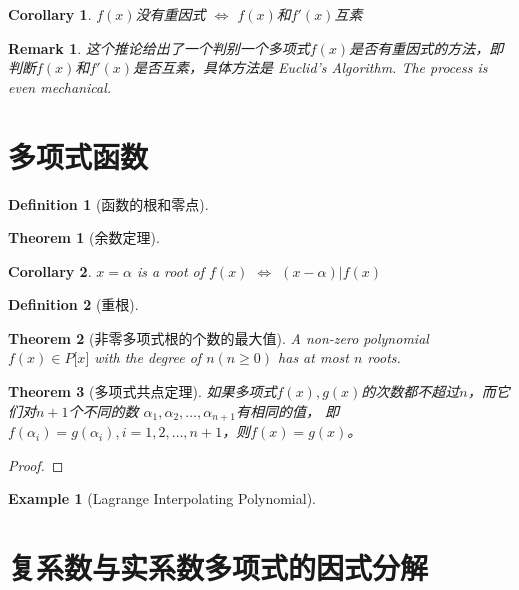 \documentclass[onecolumn]{ctexart}
\newtheorem{definition}{Definition}
\newtheorem{theorem}{Theorem}
\newtheorem{corollary}{Corollary}
\newtheorem{remark}{Remark}
\newtheorem{example}{Example}
\begin{document}
\begin{corollary}
  $f(x)$没有重因式 $\Leftrightarrow$ $f(x)$和$f'(x)$互素
\end{corollary}
\begin{remark}
  这个推论给出了一个判别一个多项式$f(x)$是否有重因式的方法，即判断$f(x)$和$f'(x)$是否互素，具体方法是
  Euclid's Algorithm. The process is even mechanical.
\end{remark}

\section{多项式函数}

\begin{definition}[函数的根和零点]
  
\end{definition}

\begin{theorem}[余数定理]
  
\end{theorem}
\begin{corollary}
  $x = \alpha$ is a root of $f(x)$ $\Leftrightarrow$ $(x - \alpha) | f(x)$
\end{corollary}

\begin{definition}[重根]
  
\end{definition}

\begin{theorem}[非零多项式根的个数的最大值]
  A non-zero polynomial $f(x) \in P\lbrack x \rbrack$ with the degree of $n (n 
  \geq 0)$ has at most $n$ roots.
\end{theorem}

\begin{theorem}[多项式共点定理]
  如果多项式$f(x), g(x)$的次数都不超过$n$，而它们对$n+1$个不同的数
  $\alpha_1, \alpha_2, \ldots, \alpha_{n+1}$有相同的值，
  即$f(\alpha_i) = g(\alpha_i), i=1,2,\ldots,n+1$，则$f(x) = g(x)$。
\end{theorem}
\begin{proof}
  
\end{proof}

\begin{example}[Lagrange Interpolating Polynomial]
  
\end{example}

\section{复系数与实系数多项式的因式分解}
\end{document}
